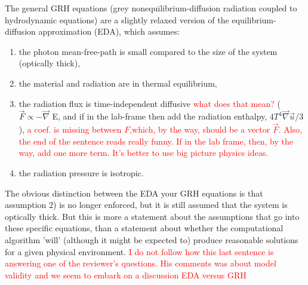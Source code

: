 \documentclass{article}
\newcommand{\grad}{\vec{\nabla}}
\newcommand{\tcr}[1]{\textcolor{red}{#1}}
\begin{document}
The general GRH equations (grey nonequilibrium-diffusion radiation coupled to hydrodynamic equations) are a slightly relaxed version of the equilibrium-diffusion approximation (EDA), which assumes:
\begin{enumerate}
\item the photon mean-free-path is small compared to the size of the system (optically thick),
\item the material and radiation are in thermal equilibrium,
\item the radiation flux is time-independent diffusive \tcr{what does that mean?} ($\vec{F} \propto - \grad$ E, and if in the lab-frame then add the radiation enthalpy, $4T^4\grad \vec{u} / 3$), \tcr{a coef. is missing between $F$,which, by the way, should be a vector $\vec{F}$. Also, the end of the sentence reads really funny. If in the lab frame, then, by the way, add one more term. It's better to use big picture physics ideas.}
\item the radiation pressure is isotropic.
\end{enumerate}
The obvious distinction between the EDA your GRH equations is that assumption 2) is no longer enforced, but it is still assumed that the system is optically thick.  But this is more a statement about the assumptions that go into these specific equations, than a statement about whether the computational algorithm 'will' (although it might be expected to) produce reasonable solutions for a given physical environment. \tcr{I do not follow how this last sentence is answering one of the reviewer's questions. His comments was about model validity and we seem to embark on a discussion EDA versus GRH} 


\end{document}
